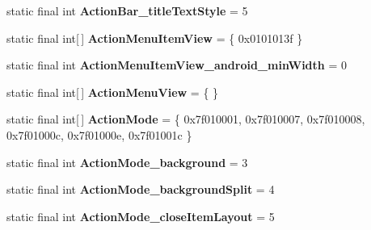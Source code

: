 \begin{DoxyCompactItemize}
\item 
\hypertarget{classandroid_1_1support_1_1design_1_1_r_1_1styleable_a0a7ad4430a13ba3151323314a540d21f}{}static final int {\bfseries Action\+Bar\+\_\+title\+Text\+Style} = 5\label{classandroid_1_1support_1_1design_1_1_r_1_1styleable_a0a7ad4430a13ba3151323314a540d21f}

\item 
\hypertarget{classandroid_1_1support_1_1design_1_1_r_1_1styleable_a8012131c7219387ea0073f47dbd32125}{}static final int\mbox{[}$\,$\mbox{]} {\bfseries Action\+Menu\+Item\+View} = \{ 0x0101013f \}\label{classandroid_1_1support_1_1design_1_1_r_1_1styleable_a8012131c7219387ea0073f47dbd32125}

\item 
\hypertarget{classandroid_1_1support_1_1design_1_1_r_1_1styleable_acb1426b9ed9e5ecec8248ef97861f86c}{}static final int {\bfseries Action\+Menu\+Item\+View\+\_\+android\+\_\+min\+Width} = 0\label{classandroid_1_1support_1_1design_1_1_r_1_1styleable_acb1426b9ed9e5ecec8248ef97861f86c}

\item 
\hypertarget{classandroid_1_1support_1_1design_1_1_r_1_1styleable_a4d18219c3fcb3eb5fec8cdc13873f0bd}{}static final int\mbox{[}$\,$\mbox{]} {\bfseries Action\+Menu\+View} = \{ \}\label{classandroid_1_1support_1_1design_1_1_r_1_1styleable_a4d18219c3fcb3eb5fec8cdc13873f0bd}

\item 
\hypertarget{classandroid_1_1support_1_1design_1_1_r_1_1styleable_aece7cc3345738baf4a59955f870e1507}{}static final int\mbox{[}$\,$\mbox{]} {\bfseries Action\+Mode} = \{ 0x7f010001, 0x7f010007, 0x7f010008, 0x7f01000c, 0x7f01000e, 0x7f01001c \}\label{classandroid_1_1support_1_1design_1_1_r_1_1styleable_aece7cc3345738baf4a59955f870e1507}

\item 
\hypertarget{classandroid_1_1support_1_1design_1_1_r_1_1styleable_a2fcf62896806a253284078a92c738931}{}static final int {\bfseries Action\+Mode\+\_\+background} = 3\label{classandroid_1_1support_1_1design_1_1_r_1_1styleable_a2fcf62896806a253284078a92c738931}

\item 
\hypertarget{classandroid_1_1support_1_1design_1_1_r_1_1styleable_a4cfd294b7efa80be3857b174e845a22b}{}static final int {\bfseries Action\+Mode\+\_\+background\+Split} = 4\label{classandroid_1_1support_1_1design_1_1_r_1_1styleable_a4cfd294b7efa80be3857b174e845a22b}

\item 
\hypertarget{classandroid_1_1support_1_1design_1_1_r_1_1styleable_aa67ed1373f9b46d1e3338368326909dd}{}static final int {\bfseries Action\+Mode\+\_\+close\+Item\+Layout} = 5\label{classandroid_1_1support_1_1design_1_1_r_1_1styleable_aa67ed1373f9b46d1e3338368326909dd}


\end{DoxyCompactItemize}
